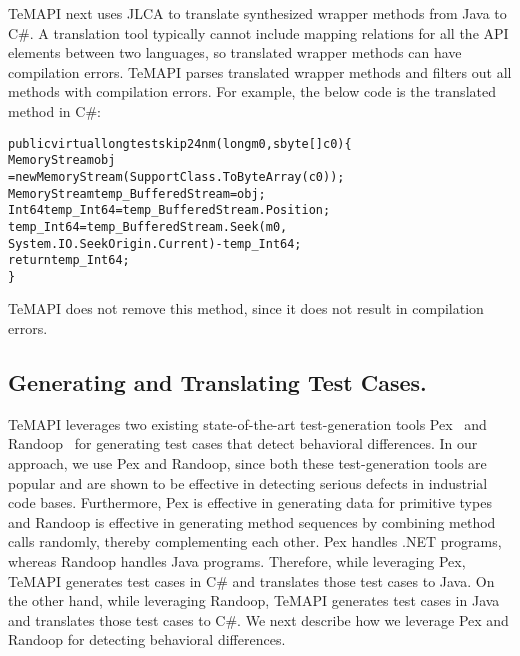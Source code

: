 TeMAPI next uses JLCA to translate synthesized wrapper methods from Java to C\#. A translation tool typically cannot include mapping relations for all the API elements between two languages, so translated wrapper methods can have compilation errors. TeMAPI parses translated wrapper methods and filters out all methods with compilation errors. For example, the below code is the translated  method in C\#:

\begin{CodeOut}%
\begin{alltt}
public virtual long testskip24nm(long m0, sbyte[] c0)\{
  MemoryStream obj
    = new MemoryStream(SupportClass.ToByteArray(c0));
  MemoryStream temp_BufferedStream = obj;
  Int64 temp_Int64 = temp_BufferedStream.Position;
  temp_Int64 = temp_BufferedStream.Seek(m0,
    System.IO.SeekOrigin.Current) - temp_Int64;
  return temp_Int64;
\}
\end{alltt}
\end{CodeOut}%

TeMAPI does not remove this method, since it does not result in compilation errors.

\subsection{Generating and Translating Test Cases.}
TeMAPI leverages two existing state-of-the-art test-generation tools Pex~\citep{tillmann2008pex} and Randoop~\citep{pacheco2007feedback} for generating test cases that detect behavioral differences. In our approach, we use Pex and Randoop, since both these test-generation tools are popular and are shown to be effective in detecting serious defects in industrial code bases. Furthermore, Pex is effective in generating data for primitive types and Randoop is effective in generating method sequences by combining method calls randomly, thereby complementing each other. Pex handles .NET programs, whereas Randoop handles Java programs. Therefore, while leveraging Pex, TeMAPI generates test cases in C\# and translates those test cases to Java. On the other hand, while leveraging Randoop, TeMAPI generates test cases in Java and translates those test cases to C\#. We next describe how we leverage Pex and Randoop for detecting behavioral differences.


